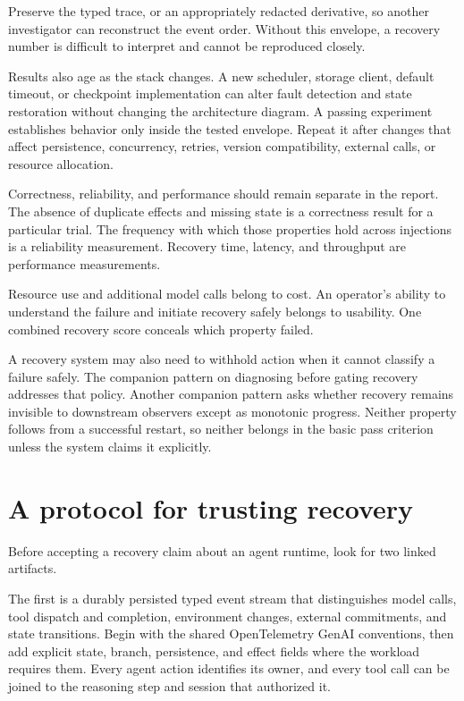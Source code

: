 Preserve the typed trace, or an appropriately redacted derivative, so another investigator can reconstruct the event order. Without this envelope, a recovery number is difficult to interpret and cannot be reproduced closely.

Results also age as the stack changes. A new scheduler, storage client, default timeout, or checkpoint implementation can alter fault detection and state restoration without changing the architecture diagram. A passing experiment establishes behavior only inside the tested envelope. Repeat it after changes that affect persistence, concurrency, retries, version compatibility, external calls, or resource allocation.

Correctness, reliability, and performance should remain separate in the report. The absence of duplicate effects and missing state is a correctness result for a particular trial. The frequency with which those properties hold across injections is a reliability measurement. Recovery time, latency, and throughput are performance measurements.

Resource use and additional model calls belong to cost. An operator's ability to understand the failure and initiate recovery safely belongs to usability. One combined recovery score conceals which property failed.

A recovery system may also need to withhold action when it cannot classify a failure safely. The companion pattern on diagnosing before gating recovery addresses that policy. Another companion pattern asks whether recovery remains invisible to downstream observers except as monotonic progress. Neither property follows from a successful restart, so neither belongs in the basic pass criterion unless the system claims it explicitly.

\hypertarget{a-protocol-for-trusting-recovery}{%
\section{A protocol for trusting recovery}\label{a-protocol-for-trusting-recovery}}

Before accepting a recovery claim about an agent runtime, look for two linked artifacts.

The first is a durably persisted typed event stream that distinguishes model calls, tool dispatch and completion, environment changes, external commitments, and state transitions. Begin with the shared OpenTelemetry GenAI conventions, then add explicit state, branch, persistence, and effect fields where the workload requires them. Every agent action identifies its owner, and every tool call can be joined to the reasoning step and session that authorized it.

